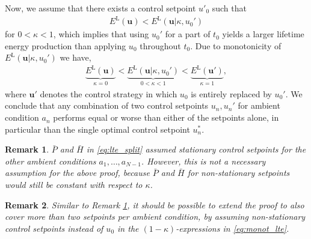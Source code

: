 \documentclass{article}
\newtheorem{remark}{Remark}
\begin{document}
    Now, we assume that there exists a control setpoint $u'_0$ such that
    \begin{align}
        E^\text{L}(\boldsymbol{u}) < E^\text{L}(\boldsymbol{u}|\kappa, u_0') 
    \end{align}
    for $0 < \kappa <1 $, which implies that using $u_0'$ for a part of $t_0$ yields a larger lifetime energy production than applying $u_0$ throughout $t_0$. Due to monotonicity of $E^\text{L}(\boldsymbol{u}|\kappa, u_0')$ we have, 
    \begin{align}
        \underbrace{E^\text{L}(\boldsymbol{u}) }_{\kappa = 0} < \underbrace{E^\text{L}(\boldsymbol{u}|\kappa, u_0')}_{0 < \kappa < 1} < \underbrace{E^\text{L}(\boldsymbol{u}')}_{\kappa = 1},
    \end{align}
    where $\boldsymbol{u}'$ denotes the control strategy in which $u_0$ is entirely replaced by $u_0'$. We conclude that any combination of two control setpoints $u_n, u_n'$ for ambient condition $a_n$ performs equal or worse than either of the setpoints alone, in particular than the single optimal control setpoint $u_n^*$.
    
    \begin{remark}
        \label{rem:other_amb_cond} $\bar{P}$ and $\bar{H}$ in \eqref{eq:lte_split} assumed stationary control setpoints for the other ambient conditions $a_1, \dots, a_{N - 1}$. However, this is not a necessary assumption for the above proof, because $\bar{P}$ and $\bar{H}$ for non-stationary setpoints would still be constant with respect to $\kappa$.
    \end{remark}
    
    \begin{remark}
        Similar to Remark \ref{rem:other_amb_cond}, it should be possible to extend the proof to also cover more than two setpoints per ambient condition, by assuming non-stationary control setpoints instead of $u_0$ in the $(1 - \kappa)$-expressions in \eqref{eq:monot_lte}.
    \end{remark}
\end{document}
